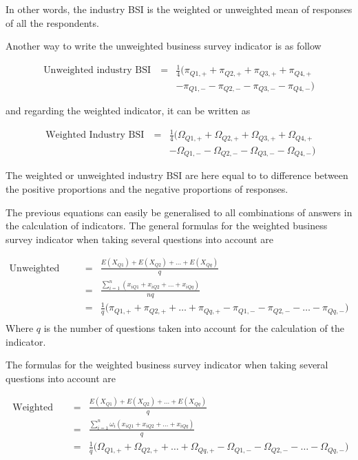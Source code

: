 \documentclass[12pt,a4paper,oneside]{book}
\begin{document}
In other words, the industry BSI is the weighted or unweighted mean of responses of all the respondents.

Another way to write the unweighted business survey indicator is as follow

\begin{eqnarray}
    \mbox{Unweighted industry BSI}\ &=& \frac{1}{4} \big( \pi_{Q1,+} + \pi_{Q2,+} + \pi_{Q3,+} + \pi_{Q4,+} \nonumber \\
    && - \pi_{Q1,-} - \pi_{Q2,-} - \pi_{Q3,-} - \pi_{Q4,-} \big)
\end{eqnarray}

and regarding the weighted indicator, it can be written as

\begin{eqnarray}
    \mbox{ Weighted Industry BSI}\ &=& \frac{1}{4} \big( \Omega_{Q1,+} + \Omega_{Q2,+} + \Omega_{Q3,+} + \Omega_{Q4,+} \nonumber \\
    && - \Omega_{Q1,-} - \Omega_{Q2,-} - \Omega_{Q3,-} - \Omega_{Q4,-} \big) 
\end{eqnarray}

The weighted or unweighted industry BSI are here equal to to difference between the positive proportions and the negative proportions of responses.


The previous equations can easily be generalised to all combinations of answers in the calculation of indicators.
The general formulas for the weighted business survey indicator when taking several questions into account are

\begin{eqnarray}
    \mbox{Unweighted BSI} &=& \frac{E(X_{Q1}) + E(X_{Q2}) + \ldots + E(X_{Qq})}{q} \\
    &=& \frac{\sum^n_{i=1}( x_{iQ1} + x_{iQ2} + \ldots + x_{iQq})}{nq} \\
    &=& \frac{1}{q} \big( \pi_{Q1,+} +  \pi_{Q2,+} + \ldots +  \pi_{Qq,+}  -  \pi_{Q1,-} -  \pi_{Q2,-} - \ldots - \pi_{Qq,-} \big) \nonumber\\
\end{eqnarray}
Where $q$ is the number of questions taken into account for the calculation of the indicator.

The formulas for the weighted business survey indicator when taking several questions into account are

\begin{eqnarray}
    \mbox{ Weighted BSI} &=& \frac{E(X_{Q1}) + E(X_{Q2}) + \ldots + E(X_{Qq})}{q} \\
    &=& \frac{\sum^n_{i=1} \omega_i \left( x_{iQ1} + x_{iQ2} +\ldots + x_{iQq} \right)}{q} \\    
    &=& \frac{1}{q} \big( \Omega_{Q1,+} + \Omega_{Q2,+} + \ldots + \Omega_{Qq,+} - \Omega_{Q1,-} - \Omega_{Q2,-} - \ldots - \Omega_{Qq,-} \big) \nonumber\\
\end{eqnarray}
\end{document}
